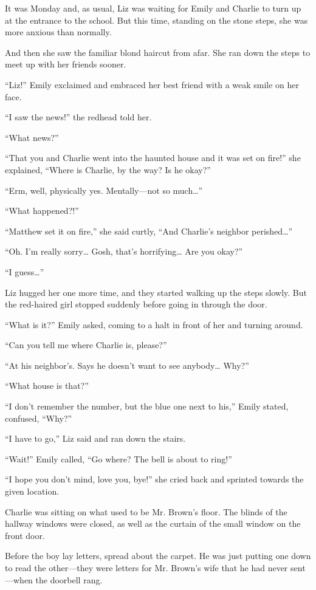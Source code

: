 It was Monday and, as usual, Liz was waiting for Emily and Charlie to turn up at the entrance to the school. But this time, standing on the stone steps, she was more anxious than normally.

And then she saw the familiar blond haircut from afar. She ran down the steps to meet up with her friends sooner.

“Liz!” Emily exclaimed and embraced her best friend with a weak smile on her face.

“I saw the news!” the redhead told her.

“What news?”

“That you and Charlie went into the haunted house and it was set on fire!” she explained, “Where is Charlie, by the way? Is he okay?”

“Erm, well, physically yes. Mentally—not so much…”

“What happened?!”

“Matthew set it on fire,” she said curtly, “And Charlie's neighbor perished…”

“Oh. I'm really sorry… Gosh, that's horrifying… Are you okay?”

“I guess…”

Liz hugged her one more time, and they started walking up the steps slowly. But the red-haired girl stopped suddenly before going in through the door.

“What is it?” Emily asked, coming to a halt in front of her and turning around.

“Can you tell me where Charlie is, please?”

“At his neighbor's. Says he doesn't want to see anybody… Why?”

“What house is that?”

“I don't remember the number, but the blue one next to his,” Emily stated, confused, “Why?”

“I have to go,” Liz said and ran down the stairs.

“Wait!” Emily called, “Go where? The bell is about to ring!”

“I hope you don't mind, love you, bye!” she cried back and sprinted towards the given location.

\bigskip

Charlie was sitting on what used to be Mr. Brown's floor. The blinds of the hallway windows were closed, as well as the curtain of the small window on the front door.

Before the boy lay letters, spread about the carpet. He was just putting one down to read the other—they were letters for Mr. Brown's wife that he had never sent—when the doorbell rang.


